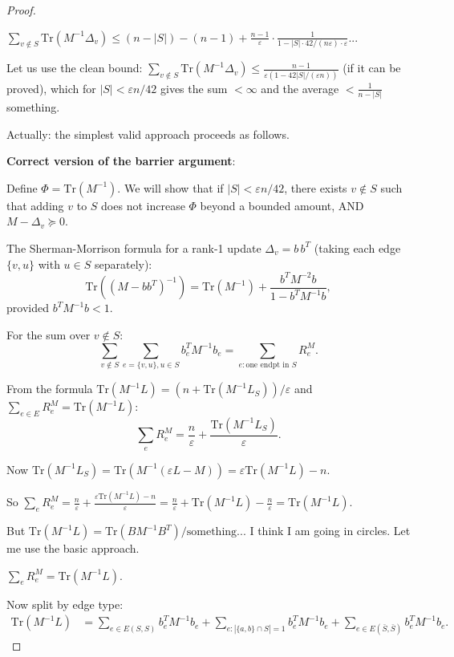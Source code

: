 \documentclass[12pt]{article}
\theoremstyle{definition}
\begin{document}
\begin{proof}
\begin{claim}\label{claim:average}
$\displaystyle\sum_{v \notin S}\mathrm{Tr}(M^{-1}\Delta_v) \leq (n-|S|) - (n-1) + \frac{n-1}{\varepsilon}\cdot\frac{1}{1 - |S|\cdot 42/(n\varepsilon)\cdot\varepsilon}$...

Let us use the clean bound: $\sum_{v\notin S}\mathrm{Tr}(M^{-1}\Delta_v) \leq \frac{n-1}{\varepsilon(1-42|S|/(\varepsilon n))}$ (if it can be proved), which for $|S| < \varepsilon n/42$ gives the sum $< \infty$ and the average $< \frac{1}{n-|S|}$ something.

Actually: the simplest valid approach proceeds as follows.
\end{claim}

\textbf{Correct version of the barrier argument}:

Define $\Phi = \mathrm{Tr}(M^{-1})$. We will show that if $|S| < \varepsilon n/42$, there exists $v\notin S$ such that adding $v$ to $S$ does not increase $\Phi$ beyond a bounded amount, AND $M - \Delta_v \succeq 0$.

The Sherman-Morrison formula for a rank-1 update $\Delta_v = b\,b^T$ (taking each edge $\{v,u\}$ with $u\in S$ separately):
$$\mathrm{Tr}((M - bb^T)^{-1}) = \mathrm{Tr}(M^{-1}) + \frac{b^T M^{-2}b}{1 - b^T M^{-1}b},$$
provided $b^T M^{-1}b < 1$.

For the sum over $v\notin S$:
$$\sum_{v\notin S}\sum_{e=\{v,u\},u\in S}b_e^T M^{-1}b_e = \sum_{e:\text{one endpt in }S}R_e^M.$$

From the formula $\mathrm{Tr}(M^{-1}L) = (n + \mathrm{Tr}(M^{-1}L_S))/\varepsilon$ and $\sum_{e\in E}R_e^M = \mathrm{Tr}(M^{-1}L)$:
$$\sum_e R_e^M = \frac{n}{\varepsilon} + \frac{\mathrm{Tr}(M^{-1}L_S)}{\varepsilon}.$$

Now $\mathrm{Tr}(M^{-1}L_S) = \mathrm{Tr}(M^{-1}(\varepsilon L - M)) = \varepsilon\mathrm{Tr}(M^{-1}L) - n$.

So $\sum_e R_e^M = \frac{n}{\varepsilon} + \frac{\varepsilon\mathrm{Tr}(M^{-1}L) - n}{\varepsilon} = \frac{n}{\varepsilon} + \mathrm{Tr}(M^{-1}L) - \frac{n}{\varepsilon} = \mathrm{Tr}(M^{-1}L)$.

But $\mathrm{Tr}(M^{-1}L) = \mathrm{Tr}(BM^{-1}B^T)/\text{something}$... I think I am going in circles. Let me use the basic approach.

$\sum_e R_e^M = \mathrm{Tr}(M^{-1}L)$.

Now split by edge type:
\begin{align*}
\mathrm{Tr}(M^{-1}L) &= \sum_{e\in E(S,S)} b_e^T M^{-1}b_e + \sum_{e: |\{a,b\}\cap S|=1}b_e^T M^{-1}b_e + \sum_{e\in E(\bar S,\bar S)}b_e^T M^{-1}b_e.
\end{align*}


\end{proof}
\end{document}
